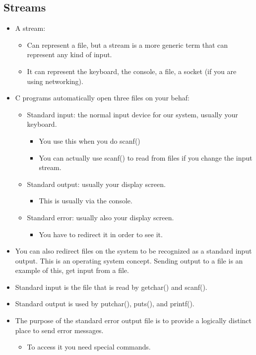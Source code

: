 \subsection{Streams}
\begin{itemize}
    \item A stream:
        \begin{itemize}
            \item Can represent a file, but a stream is a more generic term that can represent any kind of input.
            \item It can represent the keyboard, the console, a file, a socket (if you are using networking).
        \end{itemize}
    
    \item C programs automatically open three files on your behaf:
        \begin{itemize}
            \item Standard input: the normal input device for our system, usually your keyboard.
                \begin{itemize}
                    \item You use this when you do scanf()
                    \item You can actually use scanf() to read from files if you change the input stream.
                \end{itemize}
                
            \item Standard output: usually your display screen. 
                \begin{itemize}
                    \item This is usually via the console.
                \end{itemize}

            \item Standard error: usually also your display screen.
                \begin{itemize}
                    \item You have to redirect it in order to see it.
                \end{itemize}
        \end{itemize}
    
    \item You can also redirect files on the system to be recognized as a standard input output. This is an operating system concept. Sending output to a file is an example of this, get input from a file. 
    \item Standard input is the file that is read by getchar() and scanf().
    \item Standard output is used by putchar(), puts(), and printf().
    \item The purpose of the standard error output file is to provide a logically distinct place to send error messages.
        \begin{itemize}
            \item To access it you need special commands.
        \end{itemize}
    

\end{itemize}
